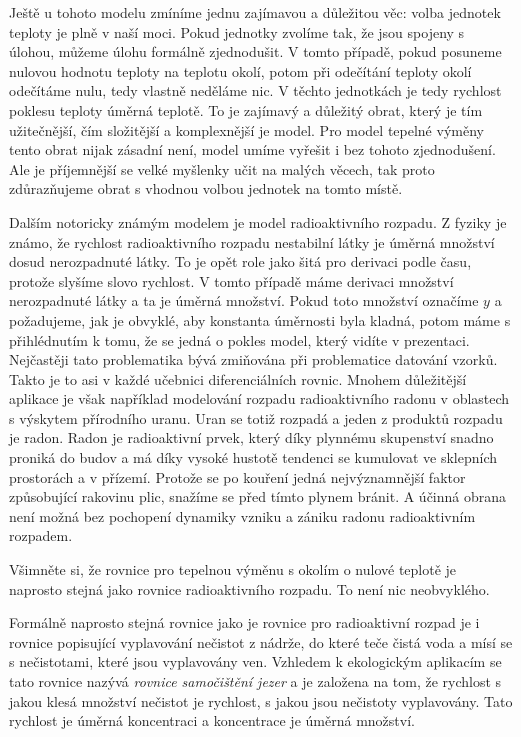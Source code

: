\documentclass[12pt]{article}
\begin{document}
Ještě u tohoto modelu zmíníme jednu zajímavou a důležitou věc: volba jednotek teploty je plně v naší moci. Pokud jednotky zvolíme tak, že jsou spojeny s úlohou, můžeme úlohu formálně zjednodušit. V tomto případě, pokud posuneme nulovou hodnotu teploty na teplotu okolí, potom při odečítání teploty okolí odečítáme nulu, tedy vlastně neděláme nic. V těchto jednotkách je tedy rychlost poklesu teploty úměrná teplotě. To je zajímavý a důležitý obrat, který je tím užitečnější, čím složitější a komplexnější je model. Pro model tepelné výměny tento obrat nijak zásadní není, model umíme vyřešit i bez tohoto zjednodušení. Ale je příjemnější se velké myšlenky učit na malých věcech, tak proto zdůrazňujeme obrat s vhodnou volbou jednotek na tomto místě.

Dalším notoricky známým modelem je model radioaktivního rozpadu. Z fyziky je známo, že rychlost radioaktivního rozpadu nestabilní látky je úměrná množství dosud nerozpadnuté látky. To je opět role jako šitá pro derivaci podle času, protože slyšíme slovo rychlost. V tomto případě máme derivaci množství nerozpadnuté látky a ta je úměrná množství. Pokud toto množství označíme $y$ a požadujeme, jak je obvyklé, aby konstanta úměrnosti byla kladná, potom máme s přihlédnutím k tomu, že se jedná o pokles model, který vidíte v prezentaci. Nejčastěji tato problematika bývá zmiňována při problematice datování vzorků. Takto je to asi v každé učebnici diferenciálních rovnic. Mnohem důležitější aplikace je však například modelování rozpadu radioaktivního radonu v oblastech s výskytem přírodního uranu. Uran se totiž rozpadá a jeden z produktů rozpadu je radon. Radon je radioaktivní prvek, který díky plynnému skupenství snadno proniká do budov a má díky vysoké hustotě tendenci se kumulovat ve sklepních prostorách a v přízemí. Protože se po kouření jedná  nejvýznamnější faktor způsobující rakovinu plic, snažíme se před tímto plynem bránit. A účinná obrana není možná bez pochopení dynamiky vzniku a zániku radonu radioaktivním rozpadem.

Všimněte si, že rovnice pro tepelnou výměnu s okolím o nulové teplotě je naprosto stejná jako rovnice radioaktivního rozpadu. To není nic neobvyklého.

Formálně naprosto stejná rovnice jako je rovnice pro radioaktivní rozpad je i rovnice popisující vyplavování nečistot z nádrže, do které teče čistá voda a mísí se s nečistotami, které jsou vyplavovány ven. Vzhledem k ekologickým aplikacím se tato rovnice nazývá \textit{rovnice samočištění jezer} a je založena na tom, že rychlost s jakou klesá množství nečistot je rychlost, s jakou jsou nečistoty vyplavovány. Tato rychlost je úměrná koncentraci a koncentrace je úměrná množství.
\end{document}
